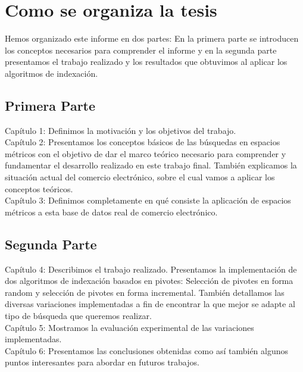 \section{Como se organiza la tesis}

Hemos organizado este informe en dos partes: En la primera parte se introducen los conceptos necesarios para comprender el informe y en la segunda parte presentamos el trabajo realizado y los resultados que obtuvimos al aplicar los algoritmos de indexaci\'on.

\subsection{Primera Parte}

Cap\'itulo 1: Definimos la motivaci\'on y los objetivos del trabajo.\\

Cap\'itulo 2: Presentamos los conceptos b\'asicos de las b\'usquedas en espacios m\'etricos con el objetivo de dar el marco te\'orico necesario para comprender y fundamentar el desarrollo realizado en este trabajo final. Tambi\'en explicamos la situaci\'on actual del comercio electr\'onico, sobre el cual vamos a aplicar los conceptos te\'oricos.\\

Cap\'itulo 3: Definimos completamente en qu\'e consiste la aplicaci\'on de espacios m\'etricos a esta base de datos real de comercio electr\'onico.

\subsection{Segunda Parte}
\noindent Cap\'itulo 4: Describimos el trabajo realizado. Presentamos la implementaci\'on de dos algoritmos de indexaci\'on basados en pivotes: Selecci\'on de pivotes en forma random y selecci\'on de pivotes en forma incremental. Tambi\'en detallamos las diversas variaciones implementadas a fin de encontrar la que mejor se adapte al tipo de b\'usqueda que queremos realizar.\\
Cap\'itulo 5: Mostramos la evaluaci\'on experimental de las variaciones implementadas.\\
Cap\'itulo 6: Presentamos las conclusiones obtenidas como as\'i tambi\'en algunos puntos interesantes para abordar en futuros trabajos.

